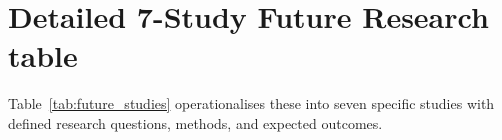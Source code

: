 \section{Detailed 7-Study Future Research table}
\label{sec:appendix_ch5_s8}

\noindent Table~\ref{tab:future_studies} operationalises these into seven specific studies with defined research questions, methods, and expected outcomes.

\iffalse %
